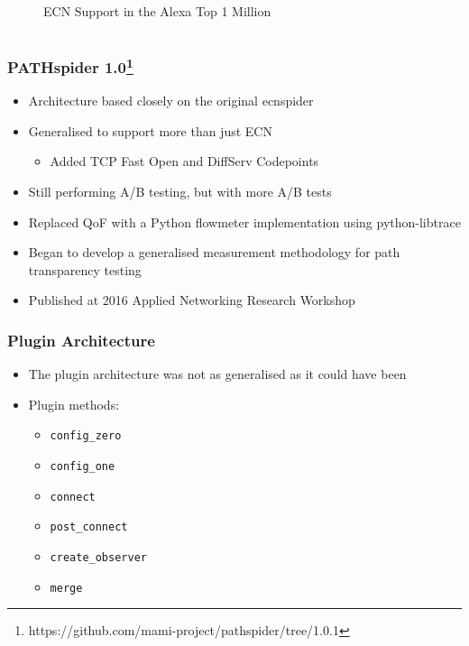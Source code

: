 \documentclass[notes]{beamer}
\begin{document}
\begin{frame}
\begin{columns}[T]
\begin{column}{.35\textwidth}
\begin{figure}
    \caption{ECN Support in the Alexa Top 1 Million}
    \end{figure}
  \end{column}
\end{columns}
\end{frame}

\begin{frame}
\frametitle{PATHspider 1.0\footnote{https://github.com/mami-project/pathspider/tree/1.0.1}}
\begin{itemize}
\item{Architecture based closely on the original ecnspider}
\item{Generalised to support more than just ECN}
\begin{itemize}
\item{Added TCP Fast Open and DiffServ Codepoints}
\end{itemize}
\item{Still performing A/B testing, but with more A/B tests}
\item{Replaced QoF with a Python flowmeter implementation using python-libtrace}
\item{Began to develop a generalised measurement methodology for path
      transparency testing}
\item{Published at 2016 Applied Networking Research Workshop~\cite{PATHspider2016}}
\end{itemize}
\end{frame}

\begin{frame}
\frametitle{Plugin Architecture}
\begin{itemize}
\item{The plugin architecture was not as generalised as it could have been}
\item{Plugin methods:}
\begin{itemize}
\item{\texttt{config\_zero}}
\item{\texttt{config\_one}}
\item{\texttt{connect}}
\item{\texttt{post\_connect}}
\item{\texttt{create\_observer}}
\item{\texttt{merge}}
\end{itemize}
\end{itemize}
\end{frame}
\end{document}
